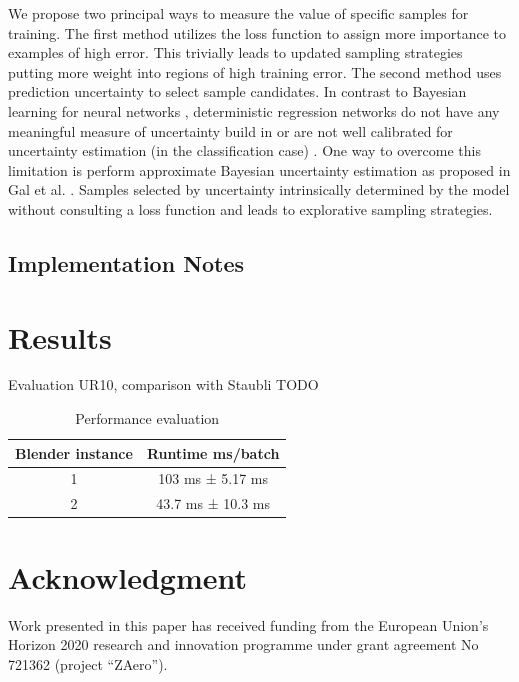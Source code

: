 \documentclass[conference]{IEEEtran}
\begin{document}
    We propose two principal ways to measure the value of specific samples for training. The first method utilizes the loss function to assign more importance to examples of high error. This trivially leads to updated sampling strategies putting more weight into regions of high training error. The second method uses prediction uncertainty to select sample candidates. In contrast to Bayesian learning for neural networks \cite{neal2012bayesian}, deterministic regression networks do not have any meaningful measure of uncertainty build in or are not well calibrated for uncertainty estimation (in the classification case) \cite{guo2017calibration}. One way to overcome this limitation is perform approximate Bayesian uncertainty estimation as proposed in Gal et al. \cite{gal2015dropout}. Samples selected by uncertainty intrinsically determined by the model without consulting a loss function and leads to explorative sampling strategies.
    




\subsection{Implementation Notes}

\section{Results}

Evaluation UR10, comparison with Staubli
TODO

\begin{table}[htbp]
\caption{Performance evaluation}
\begin{center}
\begin{tabular}{|c|c|}
\hline
\textbf{Blender instance} & \textbf{Runtime ms/batch} \\
\hline
1 & 103 ms ± 5.17 ms \\
\hline
2 & 43.7 ms ± 10.3 ms \\
\hline
\end{tabular}
\label{tab1}
\end{center}
\end{table}

\section*{Acknowledgment}

Work presented in this paper has received funding from the European Union’s Horizon 2020 research and innovation programme under grant agreement No 721362 (project “ZAero”).
\end{document}
